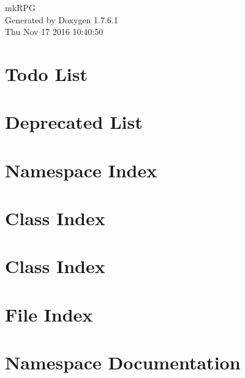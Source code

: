\documentclass[a4paper]{book}
\begin{document}
\hypersetup{pageanchor=false,citecolor=blue}
\begin{titlepage}
\vspace*{7cm}
\begin{center}
{\Large mk\-R\-P\-G }\\
\vspace*{1cm}
{\large \-Generated by Doxygen 1.7.6.1}\\
\vspace*{0.5cm}
{\small Thu Nov 17 2016 10:40:50}\\
\end{center}
\end{titlepage}
\clearemptydoublepage
{}
\tableofcontents
\clearemptydoublepage
{}
\hypersetup{pageanchor=true,citecolor=blue}
\chapter{\-Todo \-List}
\label{todo}
\hypertarget{todo}{}

\chapter{\-Deprecated \-List}
\label{deprecated}
\hypertarget{deprecated}{}

\chapter{\-Namespace \-Index}

\chapter{\-Class \-Index}

\chapter{\-Class \-Index}

\chapter{\-File \-Index}

\chapter{\-Namespace \-Documentation}

\end{document}
